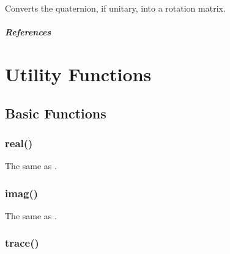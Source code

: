 \documentclass[letterpaper,10pt,english]{sphinxmanual}
\begin{document}
\begin{fulllineitems}
\label{methods:QuaternonToRotation}
\end{fulllineitems}


Converts the quaternion, if unitary, into a rotation matrix.
\paragraph{References}


\chapter{Utility Functions}
\label{functions::doc}\label{functions:utility-functions}

\section{Basic Functions}
\label{functions:basic-functions}

\subsection{real()}
\label{functions:real}

\begin{fulllineitems}
\end{fulllineitems}


The same as .


\subsection{imag()}
\label{functions:imag}

\begin{fulllineitems}
\end{fulllineitems}


The same as .


\subsection{trace()}
\label{functions:trace}

\begin{fulllineitems}
\end{fulllineitems}
\end{document}

